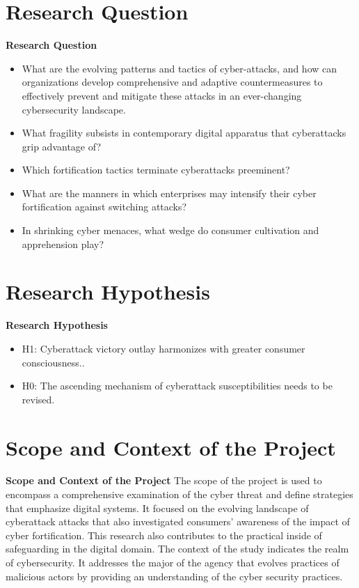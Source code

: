 
\section{Research Question}
\label{sec:into_back}
\textbf{Research Question}
\begin{itemize}
    \item What are the evolving patterns and tactics of cyber-attacks, and how can organizations develop comprehensive and adaptive countermeasures to effectively prevent and mitigate these attacks in an ever-changing cybersecurity landscape.
    \item What fragility subsists in contemporary digital apparatus that cyberattacks grip advantage of?
    \item Which fortification tactics terminate cyberattacks preeminent?
    \item What are the manners in which enterprises may intensify their cyber fortification against switching attacks?
    \item In shrinking cyber menaces, what wedge do consumer cultivation and apprehension play?
\end{itemize}

\section{Research Hypothesis}
\label{sec:into_back}
\textbf{Research Hypothesis}
\begin{itemize}
     
    \item H1: Cyberattack victory outlay harmonizes with greater consumer consciousness..
    \item H0: The ascending mechanism of cyberattack susceptibilities needs to be revised.

\end{itemize}


\section{Scope and Context of the Project}
\label{sec:into_back}
\textbf{Scope and Context of the Project}
The scope of the project is used to encompass a comprehensive examination of the cyber threat and define strategies that emphasize digital systems. It focused on the evolving landscape of cyberattack attacks that also investigated consumers' awareness of the impact of cyber fortification. This research also contributes to the practical inside of safeguarding in the digital domain.
The context of the study indicates the realm of cybersecurity. It addresses the major of the agency that evolves practices of malicious actors by providing an understanding of the cyber security practices.


